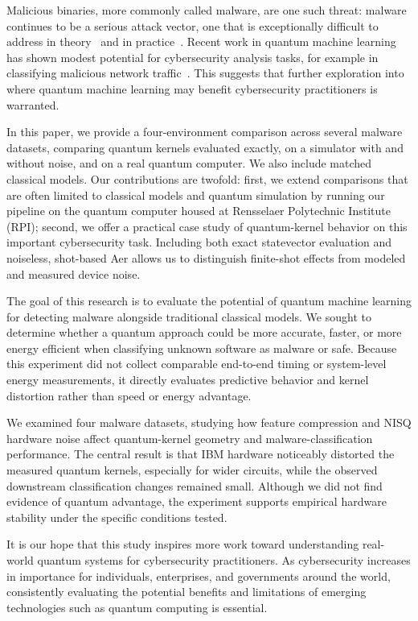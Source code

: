 \documentclass[letterpaper]{article} %
\begin{document}
Malicious binaries, more commonly called malware, are one such threat: malware continues to be a serious attack vector, one that is exceptionally difficult to address in theory~\cite{cohen1987computer} and in practice~\cite{pachhala}. Recent work in quantum machine learning has shown modest potential for cybersecurity analysis tasks, for example in classifying malicious network traffic~\cite{cotrupi}. This suggests that further exploration into where quantum machine learning may benefit cybersecurity practitioners is warranted.

In this paper, we provide a four-environment comparison across several malware datasets, comparing quantum kernels evaluated exactly, on a simulator with and without noise, and on a real quantum computer. We also include matched classical models. Our contributions are twofold: first, we extend comparisons that are often limited to classical models and quantum simulation by running our pipeline on the quantum computer housed at Rensselaer Polytechnic Institute (RPI); second, we offer a practical case study of quantum-kernel behavior on this important cybersecurity task. Including both exact statevector evaluation and noiseless, shot-based Aer allows us to distinguish finite-shot effects from modeled and measured device noise.

The goal of this research is to evaluate the potential of quantum machine learning for detecting malware alongside traditional classical models. We sought to determine whether a quantum approach could be more accurate, faster, or more energy efficient when classifying unknown software as malware or safe. Because this experiment did not collect comparable end-to-end timing or system-level energy measurements, it directly evaluates predictive behavior and kernel distortion rather than speed or energy advantage.

We examined four malware datasets, studying how feature compression and NISQ hardware noise affect quantum-kernel geometry and malware-classification performance. The central result is that IBM hardware noticeably distorted the measured quantum kernels, especially for wider circuits, while the observed downstream classification changes remained small. Although we did not find evidence of quantum advantage, the experiment supports empirical hardware stability under the specific conditions tested.

It is our hope that this study inspires more work toward understanding real-world quantum systems for cybersecurity practitioners. As cybersecurity increases in importance for individuals, enterprises, and governments around the world, consistently evaluating the potential benefits and limitations of emerging technologies such as quantum computing is essential.
\end{document}
